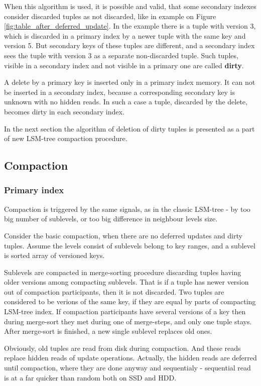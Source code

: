 \documentclass{vldb}
\begin{document}
When this algorithm is used, it is possible and valid, that some secondary
indexes consider discarded tuples as not discarded, like in example on Figure
\ref{fig:table_after_deferred_update}. In the example there is a tuple with
version 3, which is discarded in a primary index by a newer tuple with the same
key and version 5. But secondary keys of these tuples are different, and a
secondary index sees the tuple with version 3 as a separate non-discarded tuple.
Such tuples, visible in a secondary index and not visible in a primary one are
called \textbf{dirty}.

A delete by a primary key is inserted only in a primary index memory. It can not
be inserted in a secondary index, because a corresponding secondary key is
unknown with no hidden reads. In such a case a tuple, discarded by the delete,
becomes dirty in each secondary index.

In the next section the algorithm of deletion of dirty tuples is presented as a
part of new LSM-tree compaction procedure.

\subsection{Compaction}
\subsubsection{Primary index}

Compaction is triggered by the same signals, as in the classic LSM-tree - by
too big number of sublevels, or too big difference in neighbour levels size.

Consider the basic compaction, when there are no deferred updates and dirty
tuples. Assume the levels consist of sublevels belong to key ranges, and a
sublevel is sorted array of versioned keys.

Sublevels are compacted in merge-sorting procedure discarding tuples having
older versions among compacting sublevels. That is if a tuple has newer version
out of compaction participants, then it is not discarded. Two tuples are
considered to be verions of the same key, if they are equal by parts of
compacting LSM-tree index. If compaction participants have several versions of a
key then during merge-sort they met during one of merge-steps, and only one
tuple stays. After merge-sort is finished, a new single sublevel replaces old
ones.

Obviously, old tuples are read from disk during compaction. And these reads
replace hidden reads of update operations. Actually, the hidden reads are
deferred until compaction, where they are done anyway and sequentialy -
sequential read is at a far quicker than random both on SSD and HDD.
\end{document}
